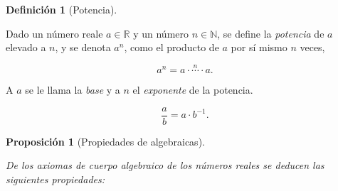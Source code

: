 \documentclass[
  a4paper,
]{scrreport}
\theoremstyle{plain}
\theoremstyle{plain}
\newtheorem{proposition}{Proposición}[chapter]
\theoremstyle{definition}
\newtheorem{definition}{Definición}[chapter]
\theoremstyle{definition}
\theoremstyle{plain}
\theoremstyle{remark}
\begin{document}
\begin{definition}[Potencia]\protect\hypertarget{def-potencia}{}\label{def-potencia}

Dado un número reale \(a\in \mathbb{R}\) y un número \(n\in\mathbb{N}\),
se define la \emph{potencia} de \(a\) elevado a \(n\), y se denota
\(a^n\), como el producto de \(a\) por sí mismo \(n\) veces,

\[a^n = a\cdot \stackrel{n}{\cdots} \cdot a.\]

A \(a\) se le llama la \emph{base} y a \(n\) el \emph{exponente} de la
potencia.

\[\frac{a}{b} = a\cdot b^{-1}.\]

\end{definition}

\begin{proposition}[Propiedades de
algebraicas]\protect\hypertarget{prp-propiedades-algebraicas}{}\label{prp-propiedades-algebraicas}

De los axiomas de cuerpo algebraico de los números reales se deducen las
siguientes propiedades:


\end{proposition}
\end{document}
